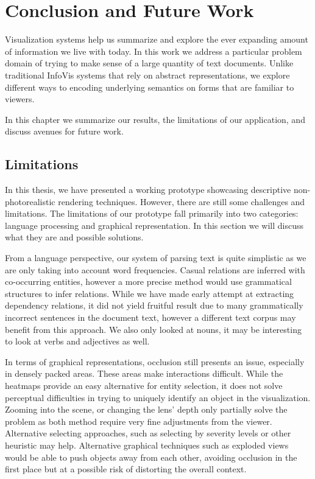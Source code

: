 \chapter{Conclusion and Future Work}
Visualization systems help us summarize and explore the ever expanding amount of
information we live with today. In this work we address a particular problem
domain of trying to make sense of a large quantity of text documents. Unlike
traditional InfoVis systems that rely on abstract representations, we explore different ways
to encoding underlying semantics on forms that are familiar to viewers. 

In this chapter we summarize our results, the limitations of our
application, and discuss avenues for future work.

\section{Limitations}
In this thesis, we have presented a working prototype showcasing descriptive
non-photorealistic rendering techniques. However, there are still some
challenges and limitations. The limitations of our prototype fall primarily into two
categories: language processing and graphical representation. In this section we
will discuss what they are and possible solutions.

From a language perspective, our system of parsing text is quite simplistic as
we are only taking into account word frequencies. Casual relations are inferred with
co-occurring entities, however a more precise method would use grammatical
structures to infer relations. While we have made early attempt at extracting
dependency relations, it did not yield fruitful result due to many grammatically
incorrect sentences in the document text, however a different text
corpus may benefit from this approach. We also only looked at nouns, it may be
interesting to look at verbs and adjectives as well.

In terms of graphical representations, occlusion still presents an issue,
especially in densely packed areas. These areas make interactions difficult.
While the heatmaps provide an easy alternative for entity selection, it does not
solve perceptual difficulties in trying to uniquely identify an object in the
visualization. Zooming into the scene, or changing the lens' depth only
partially solve the problem as both method require very fine adjustments from
the viewer. Alternative selecting approaches, such as selecting by
severity levels or other heuristic may help. Alternative graphical techniques
such as exploded views would be able to push objects away from each other, avoiding occlusion in
the first place but at a possible risk of distorting the overall context.


